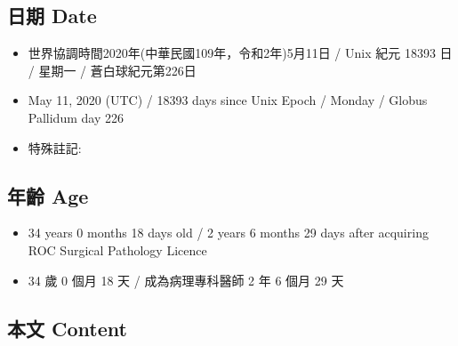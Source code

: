 \documentclass[a5paper, 11pt
]{book}
\providecommand{\tightlist}{%
  \setlength{\itemsep}{0pt}\setlength{\parskip}{0pt}}
\begin{document}
\hypertarget{ux65e5ux671f-date-71}{%
\subsection{日期 Date}\label{ux65e5ux671f-date-71}}

\begin{itemize}
\tightlist
\item
  世界協調時間2020年(中華民國109年，令和2年)5月11日 / Unix 紀元 18393 日
  / 星期一 / 蒼白球紀元第226日
\item
  May 11, 2020 (UTC) / 18393 days since Unix Epoch / Monday / Globus
  Pallidum day 226
\item
  特殊註記:
\end{itemize}

\hypertarget{ux5e74ux9f61-age-71}{%
\subsection{年齡 Age}\label{ux5e74ux9f61-age-71}}

\begin{itemize}
\tightlist
\item
  34 years 0 months 18 days old / 2 years 6 months 29 days after
  acquiring ROC Surgical Pathology Licence
\item
  34 歲 0 個月 18 天 / 成為病理專科醫師 2 年 6 個月 29 天
\end{itemize}

\hypertarget{ux672cux6587-content-71}{%
\subsection{本文 Content}\label{ux672cux6587-content-71}}
\end{document}
